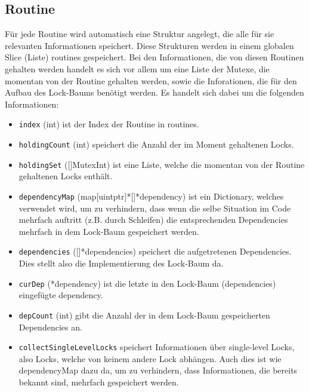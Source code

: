 \subsection{Routine}
Für jede Routine wird automatisch eine Struktur angelegt, die alle für sie 
relevanten Informationen speichert. Diese Strukturen werden in einem 
globalen Slice (Liste) routines gespeichert. Bei den Informationen, die von 
diesen Routinen gehalten werden handelt es 
sich vor allem um eine Liste der Mutexe, die momentan von der Routine 
gehalten werden, sowie die Inforationen, die für den Aufbau des Lock-Baums 
benötigt werden. Es handelt sich dabei um die folgenden Informationen:
\begin{itemize}
  \item \texttt{index} (int) ist der Index der Routine in routines.
  \item \texttt{holdingCount} (int) speichert die Anzahl der im Moment gehaltenen Locks.
  \item \texttt{holdingSet} ([]MutexInt) ist eine Liste, welche die
    momentan von der Routine gehaltenen Locks enthält.
  \item \texttt{dependencyMap} (map[uintptr]*[]*dependency) ist ein Dictionary, welches 
   verwendet wird, um zu verhindern, dass wenn die selbe Situation im Code 
   mehrfach auftritt (z.B. durch Schleifen) die entsprechenden Dependencies 
   mehrfach in dem Lock-Baum gespeichert werden.
  \item \texttt{dependencies} ([]*dependencies) speichert die aufgetretenen Dependencies.
   Dies stellt also die Implementierung des Lock-Baum da.
  \item \texttt{curDep} (*dependency) ist die letzte in den Lock-Baum (dependencies)
   eingefügte dependency.
  \item \texttt{depCount} (int) gibt die Anzahl der in dem Lock-Baum gespeicherten 
   Dependencies an.
  \item \texttt{collectSingleLevelLocks} speichert Informationen über single-level Locks, 
   also Locks, welche von keinem andere Lock abhängen. Auch dies ist wie 
   dependencyMap dazu da, um zu verhindern, dass Informationen, die
   bereits bekannt sind, mehrfach gespeichert werden. 
\end{itemize}
